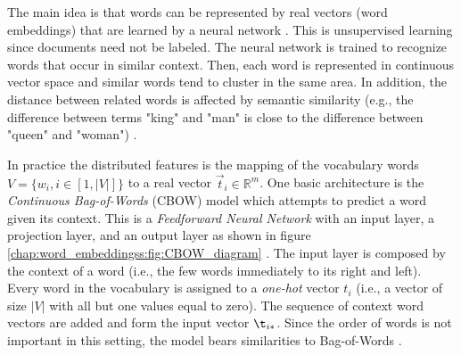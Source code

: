 The main idea is that words can be represented by real vectors (word embeddings) that are learned by a neural network . This is unsupervised learning since documents need not be labeled. The neural network is trained to recognize words that occur in similar context. Then, each word is represented in continuous vector space and similar words tend to cluster in the same area. In addition, the distance between related words is affected by semantic similarity (e.g., the difference between terms "king" and "man" is close to the difference between "queen" and "woman") . 



In practice the distributed features is the mapping of the vocabulary words $V = \{w_{i}, i \in [1, |V|] \}$ to a real vector $\vec{t}_i \in \mathbb{R}^{m}$. One basic architecture is the \textit{Continuous Bag-of-Words} (CBOW) model which attempts to predict a word given its context. This is a \textit{Feedforward Neural Network} with an input layer, a projection layer, and an output layer as shown in figure \ref{chap:word_embeddingss:fig:CBOW_diagram} . The input layer is composed by the context of a word (i.e., the few words immediately to its right and left). Every word in the vocabulary is assigned to a \textit{one-hot} vector $t_{i}$ (i.e., a vector of size $|V|$ with all but one values equal to zero). The sequence of context word vectors are added and form the input vector $\t_{i*}$. Since the order of words is not important in this setting, the model bears similarities to Bag-of-Words \parencite{mitra2018introduction}.

